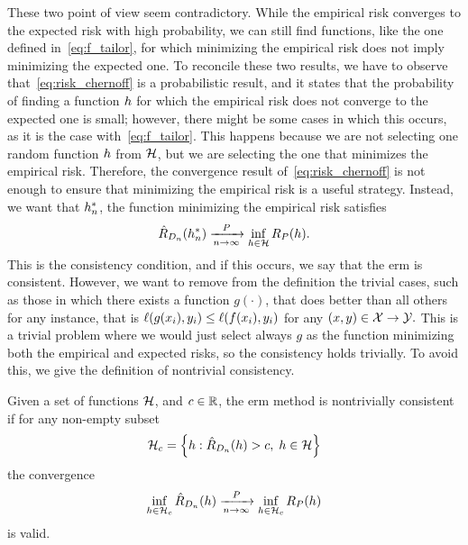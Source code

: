 %
These two point of view seem contradictory. While the empirical risk converges to the expected risk with high probability, we can still find functions, like the one defined in~\eqref{eq:f_tailor}, for which minimizing the empirical risk does not imply minimizing the expected one.
%
To reconcile these two results, we have to observe that~\eqref{eq:risk_chernoff} is a probabilistic result, and it states that the probability of finding a function $h$ for which the empirical risk does not converge to the expected one is small; however, there might be some cases in which this occurs, as it is the case with~\eqref{eq:f_tailor}. This happens because we are not selecting one random function $h$ from $\mathcal{H}$, but we are selecting the one that minimizes the empirical risk.
%
Therefore, the convergence result of~\eqref{eq:risk_chernoff} is not enough to ensure that minimizing the empirical risk is a useful strategy.
%
Instead, we want that ${h}^*_n$, the function  minimizing the empirical risk satisfies
\begin{equation}
    \nonumber
    \hat{R}_{D_{n}}({h}^*_n) \xrightarrow[n \to \infty]{P} \inf_{h \in \mathcal{H}} R_P(h) .
\end{equation}
This is the consistency condition, and if this occurs, we say that the \acrshort{erm} is consistent.
However, we want to remove from the definition the trivial cases, such as those in which there exists a function $g(\cdot)$, that does better than all others for any instance, that is 
$\ell(g(x_i), y_i) \leq \ell(f(x_i), y_i)$ for any $(x, y) \in \mathcal{X} \to \mathcal{Y}.$
This is a trivial problem where we would just select always $g$ as the function minimizing both the empirical and expected risks, so the consistency holds trivially.
To avoid this, we give the definition of nontrivial consistency.
\begin{definition}
    Given a set of functions $\mathcal{H}$, and $c \in \mathbb{R}$, the \acrshort{erm} method is nontrivially consistent if for any non-empty subset 
    \begin{equation}
        \nonumber
        \mathcal{H}_c = \left\{h: \hat{R}_{D_{n}}(h) > c, \; h \in \mathcal{H}\right\}
    \end{equation}
    the convergence
    \begin{equation}
        \nonumber
        \inf_{h \in \mathcal{H}_c} \hat{R}_{D_{n}}(h) \xrightarrow[n \to \infty]{P} \inf_{h \in \mathcal{H}_c} R_P(h) 
    \end{equation}
    is valid.
\end{definition}
